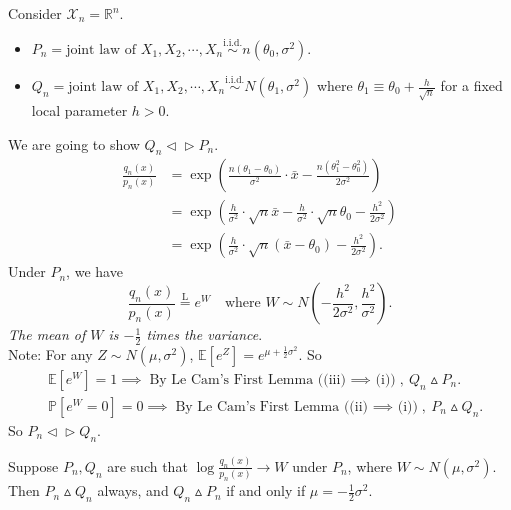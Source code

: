 \documentclass[a4paper]{article}
\begin{document}
\begin{eg}
	Consider $\mathcal{X}_n = \mathbb{R}^n$.
	\begin{itemize}
		\item $P_n = \text{joint law of } X_1,X_2,\cdots,X_n \stackrel{\text{i.i.d.}}{\sim} n(\theta_0,\sigma^2)$.
		\item $Q_n = \text{joint law of } X_1,X_2,\cdots,X_n \stackrel{\text{i.i.d.}}{\sim} N(\theta_1,\sigma^2)$  where $\theta_1 \equiv \theta_0+\frac{h}{\sqrt{n}}$ for a fixed local parameter $h > 0$.
	\end{itemize}
	We are going to show $Q_n \vartriangleleft \vartriangleright P_n$.
	\begin{equation*}
		\begin{aligned}
			\frac{q_n(x)}{p_n(x)} &= \exp \left(\frac{n(\theta_1-\theta_0)}{\sigma^2} \cdot \bar{x} - \frac{n(\theta_1^2-\theta_0^2)}{2\sigma^2}\right) \\
			&= \exp \left(\frac{h}{\sigma^2} \cdot \sqrt{n} \bar{x} - \frac{h}{\sigma^2} \cdot \sqrt{n} \theta_0 - \frac{h^2}{2\sigma^2}\right) \\
			&= \exp \left(\frac{h}{\sigma^2} \cdot \sqrt{n} (\bar{x} - \theta_0) - \frac{h^2}{2\sigma^2}\right).
		\end{aligned}
	\end{equation*}
	Under $P_n$, we have
	\begin{equation*}
		\frac{q_n(x)}{p_n(x)} \stackrel{\text{L}}{=} e^W \quad \text{where $W \sim N(-\frac{h^2}{2\sigma^2},\frac{h^2}{\sigma^2})$.}
	\end{equation*}
	\emph{The mean of $W$ is $-\frac{1}{2}$ times the variance}. \\
	Note: For any $Z \sim N(\mu,\sigma^2)$, $\mathbb{E}\left[e^Z\right] = e^{\mu + \frac{1}{2} \sigma^2}$. So
	\begin{equation*}
		\begin{aligned}
			& \mathbb{E}\left[e^W\right] = 1 \implies \text{By Le Cam’s First Lemma ((iii) $\implies$ (i))}, \ Q_n \vartriangle P_n. \\
			& \mathbb{P}\left[e^W = 0\right] = 0 \implies \text{By Le Cam’s First Lemma ((ii) $\implies$ (i))}, \ P_n \vartriangle Q_n.
		\end{aligned}
	\end{equation*}
	So $P_n \vartriangleleft \vartriangleright Q_n$.
\end{eg}

\begin{cor}
	Suppose $P_n,Q_n$ are such that $\log \frac{q_n(x)}{p_n(x)} \to W$ under $P_n$, where $W \sim N(\mu,\sigma^2)$. Then $P_n \vartriangle Q_n$ always, and $Q_n \vartriangle P_n$ if and only if $\mu = -\frac{1}{2} \sigma^2$.
\end{cor}
\end{document}

